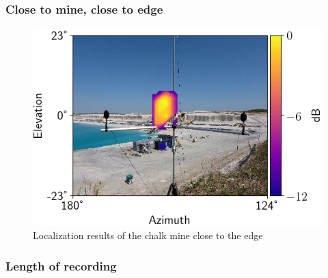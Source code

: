 \subsubsection{Close to mine, close to edge}

\begin{figure}[H]
    \centering
    \includegraphics[width=1\textwidth]{Figures/ChalkClose.png}
    \caption{Localization results of the chalk mine close to the edge}
    \label{fig:ChalkCLose}
\end{figure}

\subsubsection{Length of recording}

